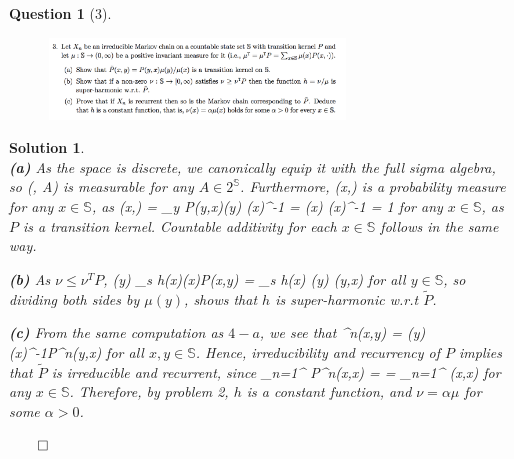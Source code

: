 \documentclass{article} %
\def\eQb#1\eQe{\begin{eqnarray*}#1\end{eqnarray*}}
\theoremstyle{quest}
\newtheorem*{question}{Question}
\newtheorem*{solution}{Solution}
\begin{document}
\begin{question}[3]
\hfill
\begin{figure}[h!]
  \centering
    \includegraphics[width=0.7\textwidth]{prob-e11-p3.png}
\end{figure}
\end{question}
\begin{solution} \hfill \\
\textbf{(a)} As the space is discrete, we canonically equip it with the 
full sigma algebra, so 
\eQb
\tilde{P}(\cdot , A)
\eQe
is measurable for any $A \in 2^{\mathbb{S}}$. Furthermore,
\eQb
\tilde{P}(x,\cdot)
\eQe 
is a probability measure for any $x \in \mathbb{S}$, as
\eQb
\tilde{P}(x,) = \sum_{y \in {}} P(y,x)\mu(y) \mu(x)^{-1} =
\mu(x) \mu(x)^{-1} = 1 
\eQe
for any $x \in \mathbb{S}$, as $P$ is a transition kernel. Countable additivity
for each $x \in \mathbb{S}$ follows in the same way.

\textbf{(b)}
As $\nu \leq \nu^{T} P$, 
\eQb
h(y) \leq \sum_{s \in {}} h(x)\mu(x)P(x,y) = \sum_{s \in {}}
h(x) \mu(y) (y,x) 
\eQe
for all $y \in \mathbb{S}$, so dividing both sides by $\mu(y)$, 
shows that $h$ is super-harmonic w.r.t $\tilde{P}$. 

\bigskip

\textbf{(c)}
From the same computation as $4-a$, we see that
\eQb
\tilde{P}^{n}(x,y) = \mu(y)\mu(x)^{-1}P^{n}(y,x)
\eQe
for all $x,y \in \mathbb{S}$. Hence, irreducibility and recurrency of $P$
implies that $\tilde{P}$ is irreducible and recurrent, since
\eQb
\sum_{n=1}^{\infty} P^{n}(x,x) = \infty = \sum_{n=1}^{\infty} (x,x)  
\eQe
for any $x \in \mathbb{S}$.
Therefore,
by problem 2, $h$ is a constant function, and $\nu = \alpha \mu$ for some $\alpha > 0$.

\hfill $\qed$

\end{solution}

\newpage
\end{document}
